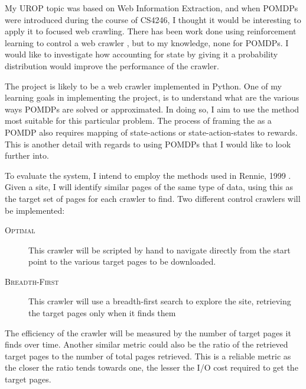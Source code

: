 \documentclass{article}
\begin{document}
My UROP topic was based on Web Information Extraction, and when POMDPs were introduced during the course of CS4246, I thought it would be interesting to apply it to focused web crawling. There has been work done using reinforcement learning to control a web crawler \cite{Perez2003,Rennie1999,Menczer2000}, but to my knowledge, none for POMDPs. I would like to investigate how accounting for state by giving it a probability distribution would improve the performance of the crawler.

The project is likely to be a web crawler implemented in Python. One of my learning goals in implementing the project, is to understand what are the various ways POMDPs are solved or approximated. In doing so, I aim to use the method most suitable for this particular problem. The process of framing the as a POMDP also requires mapping of state-actions or state-action-states to rewards. This is another detail with regards to using POMDPs that I would like to look further into.

To evaluate the system, I intend to employ the methods used in Rennie, 1999 \cite{Rennie1999}. Given a site, I will identify similar pages of the same type of data, using this as the target set of pages for each crawler to find. Two different control crawlers will be implemented:
\begin{description}
	\item[\textsc{Optimal}] This crawler will be scripted by hand to navigate directly from the start point to the various target pages to be downloaded.
	\item[\textsc{Breadth-First}] This crawler will use a breadth-first search to explore the site, retrieving the target pages only when it finds them
\end{description}
The efficiency of the crawler will be measured by the number of target pages it finds over time. Another similar metric could also be the ratio of the retrieved target pages to the number of total pages retrieved. This is a reliable metric as the closer the ratio tends towards one, the lesser the I/O cost required to get the target pages.




\end{document}
